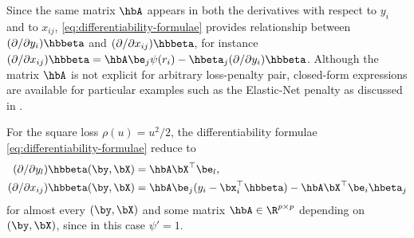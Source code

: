 \documentclass{colt2022} %
\numberwithin{equation}{section}
\begin{document}
    Since the same matrix $\hbA$ appears in both the derivatives with respect
    to $y_i$ and to $x_{ij}$,
    \eqref{eq:differentiability-formulae} provides 
    relationship between $(\partial/\partial y_i)\hbbeta$
    and $(\partial/\partial x_{ij})\hbbeta$, for instance
    $(\partial/\partial x_{ij})
    \hbbeta = \hbA \be_j \psi(r_i) - \hbeta_j (\partial/\partial y_i)\hbbeta$.
    Although the matrix $\hbA$ is not explicit for arbitrary loss-penalty
    pair, closed-form expressions are available for particular
    examples such as the Elastic-Net penalty as discussed 
    in .
\begin{remark}
    For the square loss $\rho(u)=u^2/2$,
    the differentiability formulae \eqref{eq:differentiability-formulae}
    reduce to
    \begin{equation}
        \begin{split}
        (\partial/\partial y_l) \hbbeta (\by,\bX)
        &= \hbA\bX^\top \be_l,
        \\
        (\partial/\partial x_{ij}) \hbbeta (\by,\bX)
        &= \hbA \be_j (y_i - \bx_i^\top\hbbeta) - \hbA\bX^\top \be_i \hbeta_j
        \end{split}
    \end{equation}
    for almost every $(\by,\bX)$ and some matrix $\hbA\in\R^{p\times p}$
    depending on $(\by,\bX)$, since in this case
    $\psi' = 1$.
\end{remark}
\end{document}
